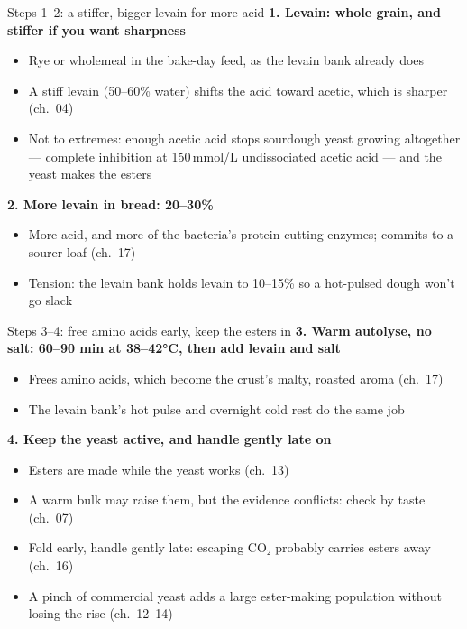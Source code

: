 \documentclass[aspectratio=169,11pt]{beamer}
\begin{document}
\begin{frame}{Steps 1--2: a stiffer, bigger levain for more acid}
  \textbf{1. Levain: whole grain, and stiffer if you want sharpness}
  \begin{itemize}\small
    \item Rye or wholemeal in the bake-day feed, as the levain bank already does
    \item A stiff levain (50--60\% water) shifts the acid toward acetic, which is sharper (ch.~04)
    \item Not to extremes: enough acetic acid stops sourdough yeast growing altogether --- complete
      inhibition at 150\,mmol/L undissociated acetic acid --- and the yeast makes the esters
  \end{itemize}
  \textbf{2. More levain in bread: 20--30\%}
  \begin{itemize}\small
    \item More acid, and more of the bacteria's protein-cutting enzymes; commits to a sourer loaf (ch.~17)
    \item Tension: the levain bank holds levain to 10--15\% so a hot-pulsed dough won't go slack
  \end{itemize}
\end{frame}

\begin{frame}{Steps 3--4: free amino acids early, keep the esters in}
  \textbf{3. Warm autolyse, no salt: 60--90 min at 38--42°C, then add levain and salt}
  \begin{itemize}\small
    \item Frees amino acids, which become the crust's malty, roasted aroma (ch.~17) \untested
    \item The levain bank's hot pulse and overnight cold rest do the same job \hypothesis
  \end{itemize}
  \textbf{4. Keep the yeast active, and handle gently late on}
  \begin{itemize}\small
    \item Esters are made while the yeast works (ch.~13)
    \item A warm bulk may raise them, but the evidence conflicts: check by taste (ch.~07) \contested
    \item Fold early, handle gently late: escaping CO₂ probably carries esters away (ch.~16) \hypothesis
    \item A pinch of commercial yeast adds a large ester-making population without losing the rise (ch.~12--14)
  \end{itemize}
\end{frame}
\end{document}
